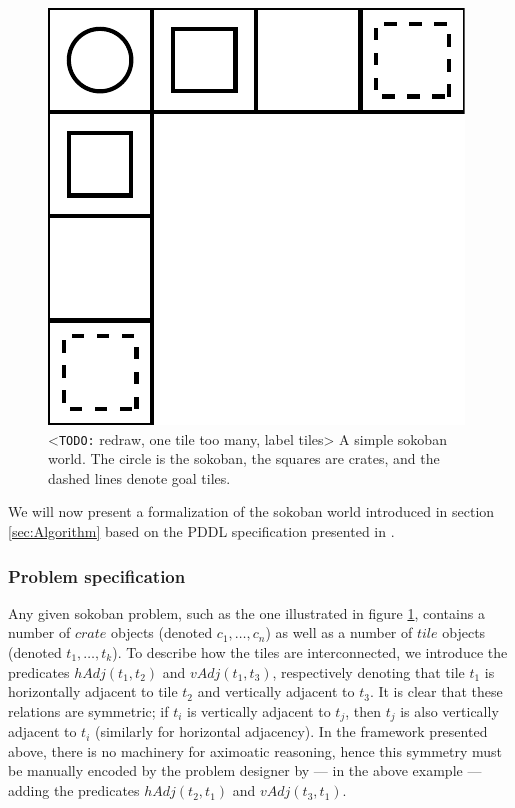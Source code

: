 \documentclass[../master.tex]{subfiles}
\begin{document}
\begin{figure}
    \centering
    \includegraphics[scale=0.7]{Graphics/soko1}
    \caption{\label{fig:simpleSokoban} <\texttt{TODO:} redraw, one tile too many, label tiles> A simple sokoban world. The circle is the sokoban, the squares are crates, and the dashed lines denote goal tiles.}
\end{figure}

We will now present a formalization of the sokoban world introduced in section \ref{sec:Algorithm} based on the PDDL specification presented in \cite{BS2011}.

\subsubsection{Problem specification}
Any given sokoban problem, such as the one illustrated in figure \ref{fig:simpleSokoban}, contains a number of $crate$ objects (denoted $c_1, \dots, c_n$) as well as a number of $tile$ objects (denoted $t_1, \dots, t_k$). To describe how the tiles are interconnected, we introduce the predicates $hAdj(t_1,t_2)$ and $vAdj(t_1,t_3)$, respectively denoting that tile $t_1$ is horizontally adjacent to tile $t_2$ and vertically adjacent to $t_3$. It is clear that these relations are symmetric; if $t_i$ is vertically adjacent to $t_j$, then $t_j$ is also vertically adjacent to $t_i$ (similarly for horizontal adjacency). In the framework presented above, there is no machinery for aximoatic reasoning, hence this symmetry must be manually encoded by the problem designer by --- in the above example --- adding the predicates $hAdj(t_2,t_1)$ and $vAdj(t_3,t_1)$.
\end{document}
